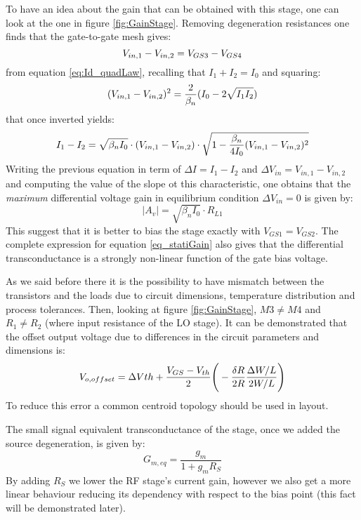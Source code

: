 To have an idea about the gain that can be obtained with this stage, one can look at the one in figure \ref{fig:GainStage}. Removing degeneration resistances one finds that the gate-to-gate mesh gives:
\begin{equation}
V_{in,1}-V_{in,2} = V_{GS3}-V_{GS4} \notag
\end{equation} 
from equation \ref{eq:Id_quadLaw}, recalling that $I_{1}+I_{2}=I_0$ and squaring:
\begin{equation}
(V_{in,1}-V_{in,2})^2 = \frac{2}{\beta_n}(I_0-2\sqrt{I_1 I_2}) \notag
\end{equation}
that once inverted yields:
\begin{equation}
I_{1}-I_{2} = \sqrt{\beta_n I_0}\cdot(V_{in,1}-V_{in,2})\cdot\sqrt{1-\frac{\beta_n}{4I_0}(V_{in,1}-V_{in,2})^2} \notag
\end{equation}
Writing the previous equation in term of $\Delta I =I_{1}-I_{2} $ and $\Delta V_{in} = V_{in,1}-V_{in,2}$ and computing the value of the slope ot this characteristic, one obtains that the \emph{maximum} differential voltage gain in equilibrium condition $\Delta V_{in} =0$ is given by:
\begin{equation}
\label{eq_statiGain}
|A_{v}|= \sqrt{\beta_{n}I_0}\cdot R_{L1}
\end{equation}
This suggest that it is better to bias the stage exactly with  $V_{GS1}=V_{GS2}$. The complete expression for equation \ref{eq_statiGain} also gives that the differential transconductance is a strongly non-linear function of the gate bias voltage. 

As we said before there it is the possibility to have mismatch between the transistors and the loads due to circuit dimensions, temperature distribution and process tolerances. Then, looking at figure \ref{fig:GainStage}, $M3 \neq M4$ and $R_1 \neq R_2$ (where input resistance of the LO stage). It can be demonstrated that the offset output voltage due to differences in the circuit parameters and dimensions is:
\begin{equation}
V_{o,offset}= \Delta V{th}+\frac{V_{GS}-V_{th}}{2}\Bigg(-\frac{\delta R}{2R}\frac{\Delta W /L}{2W/L}\Bigg) \notag
\end{equation}
To reduce this error a common centroid topology should be used in layout. 

The small signal equivalent transconductance of the stage, once we added the source degeneration, is given by:
\begin{equation}
\label{eq_degenGain}
G_{m,eq} = \frac{g_m}{1+g_m R_S}
\end{equation}
By adding $R_S$ we lower the RF stage's current gain, however  we also get a more linear behaviour reducing its dependency with respect to the bias point (this fact will be demonstrated later).

